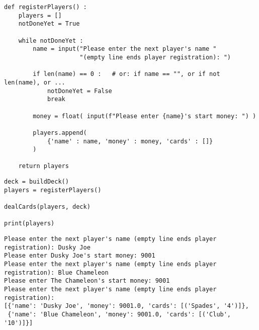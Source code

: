 \begin{frame}[fragile]
%
\begin{codebox}
\begin{verbatim}
def registerPlayers() :
    players = []
    notDoneYet = True
    
    while notDoneYet :
        name = input("Please enter the next player's name "
                     "(empty line ends player registration): ")
        
        if len(name) == 0 :   # or: if name == "", or if not len(name), or ...
            notDoneYet = False
            break
        
        money = float( input(f"Please enter {name}'s start money: ") )
        
        players.append(
            {'name' : name, 'money' : money, 'cards' : []}
        )
    
    return players
\end{verbatim}
\end{codebox}
%
\end{frame}


\begin{frame}[fragile]
%
\begin{codebox}
\begin{verbatim}
deck = buildDeck()
players = registerPlayers()

dealCards(players, deck)

print(players)
\end{verbatim}
\end{codebox}
%
\begin{cmdbox}
\begin{verbatim}
Please enter the next player's name (empty line ends player registration): Dusky Joe
Please enter Dusky Joe's start money: 9001
Please enter the next player's name (empty line ends player registration): Blue Chameleon
Please enter The Chameleon's start money: 9001
Please enter the next player's name (empty line ends player registration):
[{'name': 'Dusky Joe', 'money': 9001.0, 'cards': [('Spades', '4')]},
 {'name': 'Blue Chameleon', 'money': 9001.0, 'cards': [('Club', '10')]}]
\end{verbatim}
\end{cmdbox}
%
\end{frame}
